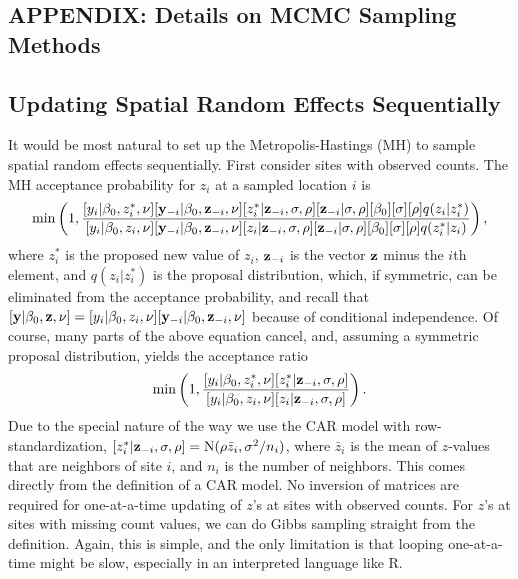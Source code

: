 \documentclass[11pt, titlepage]{article}
\begin{document}
\begin{spacing}{1.9}
\begin{flushleft}
\section*{APPENDIX: Details on MCMC Sampling Methods} \label{app:MCMCmeth}

\internallinenumbers


\subsection{Updating Spatial Random Effects Sequentially}

It would be most natural to set up the Metropolis-Hastings (MH) to sample spatial random effects sequentially. First consider sites with observed counts. The MH acceptance probability for $z_{i}$ at a sampled location $i$ is
$$
\min\left(1,\frac{[y_{i}|\beta_{0},z^{*}_{i},\nu][\mathbf{y}_{-i}|\beta_{0},\mathbf{z}_{-i},\nu][z^{*}_{i}|\mathbf{z}_{-i},\sigma,\rho][\mathbf{z}_{-i}|\sigma,\rho][\beta_{0}] [\sigma] [\rho]q(z_{i}|z_{i}^{*})}
	{[y_{i}|\beta_{0},z_{i},\nu][\mathbf{y}_{-i}|\beta_{0},\mathbf{z}_{-i},\nu][z_{i}|\mathbf{z}_{-i},\sigma,\rho][\mathbf{z}_{-i}|\sigma,\rho][\beta_{0}] [\sigma] [\rho]q(z_{i}^{*}|z_{i})}\right),
$$
where $z_{i}^{*}$ is the proposed new value of $z_{i}$,  $\mathbf{z}_{-i}$ is the vector $\mathbf{z}$ minus the $i$th element, and $q(z_{i}|z_{i}^{*})$ is the proposal distribution, which, if symmetric, can be eliminated from the acceptance probability, and recall that $[\mathbf{y}|\beta_{0},\mathbf{z},\nu] = [y_{i}|\beta_{0},z_{i},\nu][\mathbf{y}_{-i}|\beta_{0},\mathbf{z}_{-i},\nu]$ because of conditional independence. Of course, many parts of the above equation cancel, and, assuming a symmetric proposal distribution, yields the acceptance ratio
$$
\min\left(1,\frac{[y_{i}|\beta_{0},z^{*}_{i},\nu][z^{*}_{i}|\mathbf{z}_{-i},\sigma,\rho]}
	{[y_{i}|\beta_{0},z_{i},\nu][z_{i}|\mathbf{z}_{-i},\sigma,\rho]}\right).
$$
Due to the special nature of the way we use the CAR model with row-standardization, $[z^{*}_{i}|\mathbf{z}_{-i},\sigma,\rho] = \textrm{N}(\rho\bar{z}_{i},\sigma^{2}/n_{i})$, where $\bar{z}_{i}$ is the mean of $z$-values that are neighbors of site $i$, and $n_{i}$ is the number of neighbors. This comes directly from the definition of a CAR model. No inversion of matrices are required for one-at-a-time updating of $z$'s at sites with observed counts.  For $z$'s at sites with missing count values, we can do Gibbs sampling straight from the definition.  Again, this is simple, and the only limitation is that looping one-at-a-time might be slow, especially in an interpreted language like R.


\end{flushleft}
\end{spacing}
\end{document}

